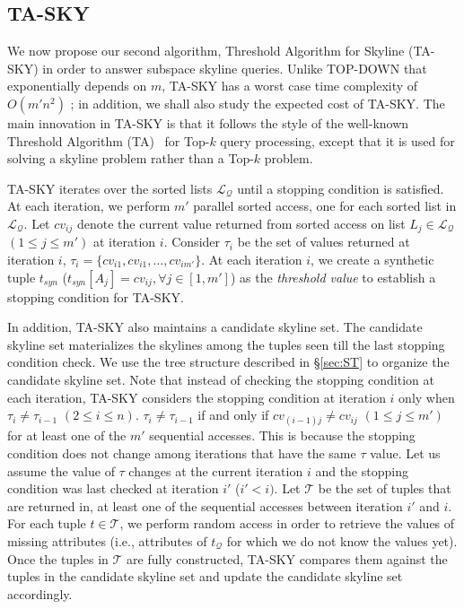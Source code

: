 \vspace{-3mm}
\subsection{TA-SKY}\label{sec:TASky}
We now propose our second algorithm, Threshold Algorithm for Skyline (TA-SKY) in order to answer subspace skyline queries. 
Unlike TOP-DOWN that exponentially depends on $m$, TA-SKY has a worst case time complexity of $O(m'n^2)$ \cite{TechReport}; in addition, we shall also study the expected cost of TA-SKY.
The main innovation in TA-SKY is that it follows the style of the well-known Threshold Algorithm (TA)~\cite{fagin2003optimal} for Top-$k$ query processing, except that it is used for solving a skyline problem rather than a Top-$k$ problem. 

TA-SKY iterates over the sorted lists $\mathcal{L_Q}$ until a stopping condition is satisfied. At each iteration, we perform $m'$ parallel sorted access, one for each sorted list in $\mathcal{L_Q}$. Let $cv_{ij}$ denote the current value returned from sorted access on list $L_j \in \mathcal{L_Q}$ $(1 \leq j \leq m')$ at iteration $i$. Consider $\tau_i$ be the set of values returned at iteration $i$, $\tau_i = \{cv_{i1}, cv_{i1}, \ldots, cv_{im'}\}$. At each iteration $i$, we create a synthetic tuple $t_{syn}$ ($t_{syn}[A_j] = cv_{ij}, \forall j \in [1, m']$) as the \textit{threshold value} to establish a stopping condition for TA-SKY. 

In addition, TA-SKY also maintains a candidate skyline set. The candidate skyline set materializes the skylines among the tuples seen till the last stopping condition check. We use the tree structure described in \S\ref{sec:ST} to organize the candidate skyline set. Note that instead of checking the stopping condition at each iteration, TA-SKY considers the stopping condition at iteration $i$ only when $\tau_i \neq \tau_{i-1}$ $(2 \leq i \leq n)$.  $\tau_i \neq \tau_{i-1}$ if and only if $cv_{(i-1)j} \neq cv_{ij}$ $(1 \leq j \leq m')$ for at least one of the $m'$ sequential accesses. This is because the stopping condition does not change among iterations that have the same $\tau$ value. Let us assume the value of $\tau$ changes at the current iteration $i$ and the stopping condition was last checked at iteration $i'$ ($i' < i)$. Let $\mathcal{T}$ be the set of tuples that are returned in, at least one of the sequential accesses between iteration $i'$ and $i$. For each tuple $t \in \mathcal{T}$, we perform random access in order to retrieve the values of missing attributes (i.e., attributes of $t_\mathcal{Q}$ for which we do not know the values yet). Once the tuples in $\mathcal{T}$ are fully constructed, TA-SKY compares them against the tuples in the candidate skyline set and update the candidate skyline set accordingly.

